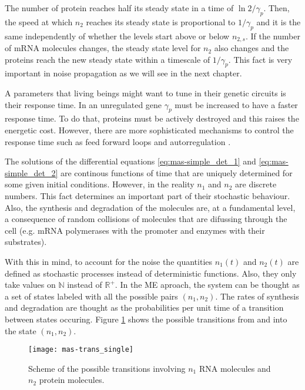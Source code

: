 The number of protein reaches half its steady state in a time of $\ln 2/\gamma_p$. Then, the speed at which $n_2$ reaches its steady state is proportional to $1/\gamma_p$ and it is the same independently of whether the levels start above or below $n_{2,s}$. If the number of mRNA molecules changes, the steady state level for $n_2$ also changes and the proteins reach the new steady state within a timescale of $1/\gamma_p$. This fact is very important in noise propagation as we will see in the next chapter.

A parameters that living beings might want to tune in their genetic circuits is their response time. In an unregulated gene $\gamma_p$ must be increased to have a faster response time. To do that, proteins must be actively destroyed and this raises the energetic cost. However, there are more sophisticated mechanisms to control the response time such as feed forward loops and autorregulation \cite{alon06}.

The solutions of the differential equations \eqref{eq:mas-simple_det_1} and \eqref{eq:mas-simple_det_2} are continous functions of time that are uniquely determined for some given initial conditions. However, in the reality $n_1$ and $n_2$ are discrete numbers. This fact determines an important part of their stochastic behaviour. Also, the synthesis and degradation of the molecules are, at a fundamental level, a consequence of random collisions of molecules that are difussing through the cell (e.g. mRNA polymerases with the promoter and enzymes with their substrates).

With this in mind, to account for the noise the quantities $n_1(t)$ and $n_2(t)$ are defined as stochastic processes instead of deterministic functions. Also, they only take values on $\mathbb{N}$ instead of $\mathbb{R}^+$. In the ME aproach, the system can be thought as a set of states labeled with all the possible pairs $(n_1,n_2)$. The rates of synthesis and degradation are thought as the probabilities per unit time of a transition between states occuring. Figure \ref{fig:mas-trans_single} shows the possible transitions from and into the state $(n_1,n_2)$.

\begin{figure}[H]
  \centering
  \texttt{[image: mas-trans\_single]}
  \caption[Transitions between states for a single gene]{\label{fig:mas-trans_single} Scheme of the possible transitions involving $n_1$ RNA molecules and $n_2$ protein molecules.}
\end{figure}

